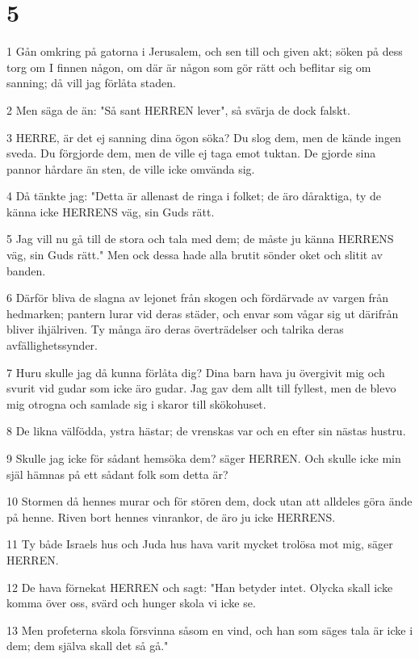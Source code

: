\chapter{5}

\par 1 Gån omkring på gatorna i Jerusalem, och sen till och given akt; söken på dess torg om I finnen någon, om där är någon som gör rätt och beflitar sig om sanning; då vill jag förlåta staden.
\par 2 Men säga de än: "Så sant HERREN lever", så svärja de dock falskt.
\par 3 HERRE, är det ej sanning dina ögon söka? Du slog dem, men de kände ingen sveda. Du förgjorde dem, men de ville ej taga emot tuktan. De gjorde sina pannor hårdare än sten, de ville icke omvända sig.
\par 4 Då tänkte jag: "Detta är allenast de ringa i folket; de äro dåraktiga, ty de känna icke HERRENS väg, sin Guds rätt.
\par 5 Jag vill nu gå till de stora och tala med dem; de måste ju känna HERRENS väg, sin Guds rätt." Men ock dessa hade alla brutit sönder oket och slitit av banden.
\par 6 Därför bliva de slagna av lejonet från skogen och fördärvade av vargen från hedmarken; pantern lurar vid deras städer, och envar som vågar sig ut därifrån bliver ihjälriven. Ty många äro deras överträdelser och talrika deras avfällighetssynder.
\par 7 Huru skulle jag då kunna förlåta dig? Dina barn hava ju övergivit mig och svurit vid gudar som icke äro gudar. Jag gav dem allt till fyllest, men de blevo mig otrogna och samlade sig i skaror till skökohuset.
\par 8 De likna välfödda, ystra hästar; de vrenskas var och en efter sin nästas hustru.
\par 9 Skulle jag icke för sådant hemsöka dem? säger HERREN. Och skulle icke min själ hämnas på ett sådant folk som detta är?
\par 10 Stormen då hennes murar och för stören dem, dock utan att alldeles göra ände på henne. Riven bort hennes vinrankor, de äro ju icke HERRENS.
\par 11 Ty både Israels hus och Juda hus hava varit mycket trolösa mot mig, säger HERREN.
\par 12 De hava förnekat HERREN och sagt: "Han betyder intet. Olycka skall icke komma över oss, svärd och hunger skola vi icke se.
\par 13 Men profeterna skola försvinna såsom en vind, och han som säges tala är icke i dem; dem själva skall det så gå."
